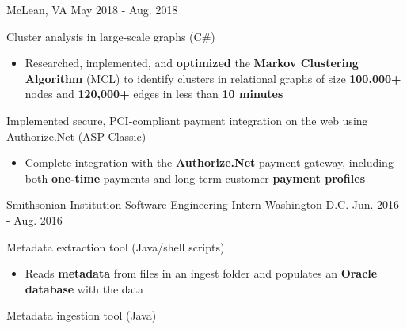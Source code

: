 \begin{cventries}
    {McLean, VA}
    {May 2018 - Aug. 2018}
    {
        \begin{cvitems}
		\item{Cluster analysis in large-scale graphs (C\#)}
			\begin{itemize}
				\item{Researched, implemented, and \textbf{optimized} the \textbf{Markov Clustering Algorithm} (MCL) to identify clusters in relational graphs of size \textbf{100,000+} nodes and \textbf{120,000+} edges in less than \textbf{10 minutes}}
			\end{itemize}
		\item{Implemented secure, PCI-compliant payment integration on the web using Authorize.Net (ASP Classic)}
			\begin{itemize}
				\item{Complete integration with the \textbf{Authorize.Net} payment gateway, including both \textbf{one-time} payments and long-term customer \textbf{payment profiles}}
			\end{itemize}
        \end{cvitems}
    }
    \cventry
    {Smithsonian Institution}
    {Software Engineering Intern}
    {Washington D.C.}
    {Jun. 2016 - Aug. 2016}
    {
        \begin{cvitems}
		\item{Metadata extraction tool (Java/shell scripts)}
        \begin{itemize}
			\item{Reads \textbf{metadata} from files in an ingest folder and populates an \textbf{Oracle database} with the data}
        \end{itemize}
		\item{Metadata ingestion tool (Java)}

\end{cvitems}}
\end{cventries}
